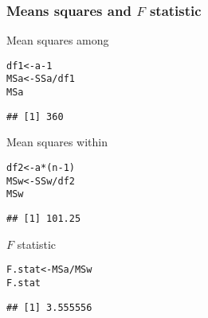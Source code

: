 \documentclass[color=usenames,dvipsnames]{beamer}\usepackage[]{graphicx}\usepackage[]{color}
\makeatletter
\newcommand{\hlnum}[1]{\textcolor[rgb]{0.69,0.494,0}{#1}}%
\newcommand{\hlopt}[1]{\textcolor[rgb]{0,0,0}{#1}}%
\newcommand{\hlstd}[1]{\textcolor[rgb]{0,0,0}{#1}}%
\newcommand{\hlkwb}[1]{\textcolor[rgb]{0,0.341,0.682}{#1}}%
\newenvironment{kframe}{%
 \def\at@end@of@kframe{}%
 \ifinner\ifhmode%
  \def\at@end@of@kframe{\end{minipage}}%
  \begin{minipage}{\columnwidth}%
 \fi\fi%
 \def\FrameCommand##1{\hskip\@totalleftmargin \hskip-\fboxsep
 \colorbox{shadecolor}{##1}\hskip-\fboxsep
     \hskip-\linewidth \hskip-\@totalleftmargin \hskip\columnwidth}%
 \MakeFramed {\advance\hsize-\width
   \@totalleftmargin\z@ \linewidth\hsize
   \@setminipage}}%
 {\par\unskip\endMakeFramed%
 \at@end@of@kframe}
\newenvironment{knitrout}{}{} %
\makeatother
\begin{document}
\begin{frame}[fragile]
  \frametitle{Means squares and $F$ statistic}
  {%
    Mean squares among}
\begin{knitrout}\footnotesize
{}\color{fgcolor}\begin{kframe}
\begin{alltt}
\hlstd{df1} \hlkwb{<-} \hlstd{a}\hlopt{-}\hlnum{1}
\hlstd{MSa} \hlkwb{<-} \hlstd{SSa} \hlopt{/} \hlstd{df1}
\hlstd{MSa}
\end{alltt}
\begin{verbatim}
## [1] 360
\end{verbatim}
\end{kframe}
\end{knitrout}
\pause
\vfill
  {%
    Mean squares within}
\begin{knitrout}\footnotesize
{}\color{fgcolor}\begin{kframe}
\begin{alltt}
\hlstd{df2} \hlkwb{<-} \hlstd{a}\hlopt{*}\hlstd{(n}\hlopt{-}\hlnum{1}\hlstd{)}
\hlstd{MSw} \hlkwb{<-} \hlstd{SSw} \hlopt{/} \hlstd{df2}
\hlstd{MSw}
\end{alltt}
\begin{verbatim}
## [1] 101.25
\end{verbatim}
\end{kframe}
\end{knitrout}
\pause
\vfill
  {%
    $F$ statistic}
\begin{knitrout}\footnotesize
{}\color{fgcolor}\begin{kframe}
\begin{alltt}
\hlstd{F.stat} \hlkwb{<-} \hlstd{MSa} \hlopt{/} \hlstd{MSw}
\hlstd{F.stat}
\end{alltt}
\begin{verbatim}
## [1] 3.555556
\end{verbatim}
\end{kframe}
\end{knitrout}
\end{frame}
\end{document}
